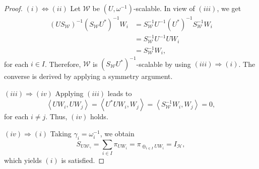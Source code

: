 \documentclass[10pt,a4paper]{amsart}
\begin{document}
\begin{proof}
$(i)\Leftrightarrow (ii)$ Let $\mathcal{W}$ be $\left( U,\omega^{-1}\right) $-scalable. In view of $(iii)$, we get
\begin{align*}
\left( US_{\mathcal{W}}\right) ^{-1}\left( S_{\mathcal{W}}U^*\right) ^{-1}W_{i}&=S_{\mathcal{W}}^{-1}U^{-1}\left( U^*\right) ^{-1}S_{\mathcal{W}}^{-1}W_{i}
\\&=S_{\mathcal{W}}^{-1}U^{-1}UW_{i}
\\&=S_{\mathcal{W}}^{-1}W_{i},
\end{align*}
for each $ i\in I $. Therefore, $\mathcal{W}$ is $\left( S_{\mathcal{W}}U^*\right) ^{-1}$-scalable by using $(iii)\Rightarrow(i)$. The converse is derived by applying a symmetry argument.



$(iii)\Rightarrow (iv)$ Applying $(iii)$ leads to 
\begin{equation*}
\left\langle UW_{i},UW_{j} \right\rangle = \left\langle U^{*}UW_{i},W_{j} \right\rangle = \left\langle S_{\mathcal{W}}^{-1}W_{i},W_{j} \right\rangle =0,
\end{equation*}
for each $i\neq j.$ Thus, $(iv)$ holds.


$(iv)\Rightarrow (i)$ Taking $ \gamma_{i}=\omega_{i}^{-1}$, we obtain
\begin{equation*}
S_{U\mathcal{W}_{\gamma}}=\sum_{i \in I} \pi_{UW_{i}}=\pi_{\oplus_{i \in I} UW_{i}}=I_{\mathcal {H}},
\end{equation*}
which yields $(i)$ is satisfied.
\end{proof}
\end{document}
